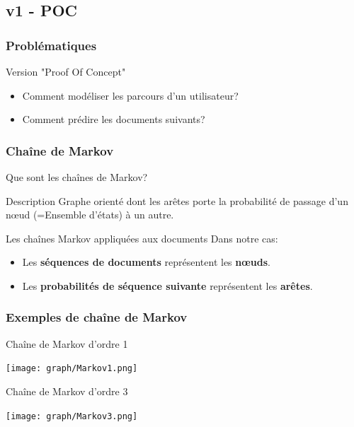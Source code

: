 \documentclass{beamer}
\begin{document}
        \subsection{v1 - POC}
            \begin{frame}
            \frametitle{Problématiques}
            Version "Proof Of Concept"
            \begin{itemize}
            \pause
            \item Comment modéliser les parcours d'un utilisateur?
            \pause
            \item Comment prédire les documents suivants?
            \end{itemize}
            \end{frame}
            \begin{frame}
            \frametitle{Chaîne de Markov}
            Que sont les chaînes de Markov?
            \pause
            \begin{block}{Description}
            Graphe orienté dont les arêtes porte la probabilité de passage d'un nœud (=Ensemble d'états) à un autre.
            \end{block}
            \pause
            \begin{block}{Les chaînes Markov appliquées aux documents}
            Dans notre cas:
            \begin{itemize}
            \item Les \textbf{séquences de documents} représentent les \textbf{nœuds}.
            \item Les \textbf{probabilités de séquence suivante} représentent les \textbf{arêtes}.
            \end{itemize}
            \end{block}
            \end{frame}
            \begin{frame}
            \frametitle{Exemples de chaîne de Markov}
            \pause
            \begin{exampleblock}{Chaîne de Markov d'ordre 1}
            \begin{center}
            \texttt{[image: graph/Markov1.png]}
            \end{center}
            \end{exampleblock}
            \pause
            \begin{exampleblock}{Chaîne de Markov d'ordre 3}
            \begin{center}
            \texttt{[image: graph/Markov3.png]}
            \end{center}
            \end{exampleblock}
            \end{frame}
\end{document}

